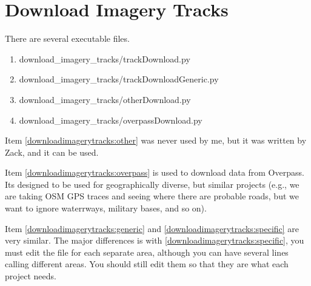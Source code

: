 \section{Download Imagery Tracks}
There are several executable files.
\begin{enumerate}
\item download\_imagery\_tracks/trackDownload.py \label{downloadimagerytracks:specific}
\item download\_imagery\_tracks/trackDownloadGeneric.py \label{downloadimagerytracks:generic}
\item download\_imagery\_tracks/otherDownload.py \label{downloadimagerytracks:other}
\item download\_imagery\_tracks/overpassDownload.py \label{downloadimagerytracks:overpass}
\end{enumerate}

Item \ref{downloadimagerytracks:other} was never used by me, but it was written by Zack, and it can be used.

Item \ref{downloadimagerytracks:overpass} is used to download data from Overpass. Its designed to be used for geographically diverse, but similar projects (e.g., we are taking OSM GPS traces and seeing where there are probable roads, but we want to ignore waterrways, military bases, and so on).

Item \ref{downloadimagerytracks:generic} and \ref{downloadimagerytracks:specific} are very similar. The major differences is with \ref{downloadimagerytracks:specific}, you must edit the file for each separate area, although you can have several lines calling different areas. You should still edit them so that they are what each project needs.
